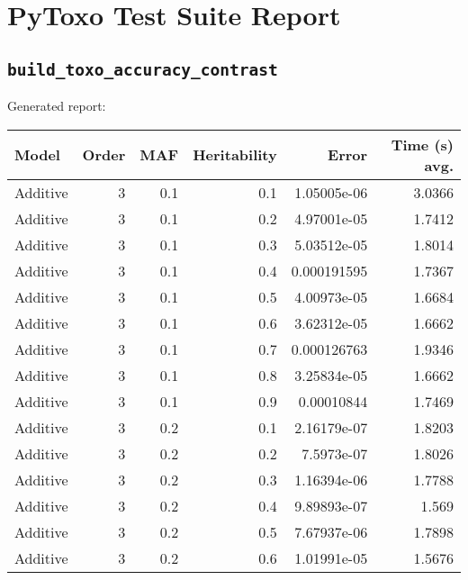 \documentclass{article}
\begin{document}
\section*{PyToxo Test Suite Report}
\subsection*{\texttt{build\_toxo\_accuracy\_contrast}}
Generated report:

\begin{longtable}[H]{lrrrrr}
\hline
 Model          &   Order &   MAF &   Heritability &            Error &   Time (s) avg. \\
\hline
 Additive       &       3 &   0.1 &            0.1 &      1.05005e-06 &          3.0366 \\
 Additive       &       3 &   0.1 &            0.2 &      4.97001e-05 &          1.7412 \\
 Additive       &       3 &   0.1 &            0.3 &      5.03512e-05 &          1.8014 \\
 Additive       &       3 &   0.1 &            0.4 &      0.000191595 &          1.7367 \\
 Additive       &       3 &   0.1 &            0.5 &      4.00973e-05 &          1.6684 \\
 Additive       &       3 &   0.1 &            0.6 &      3.62312e-05 &          1.6662 \\
 Additive       &       3 &   0.1 &            0.7 &      0.000126763 &          1.9346 \\
 Additive       &       3 &   0.1 &            0.8 &      3.25834e-05 &          1.6662 \\
 Additive       &       3 &   0.1 &            0.9 &      0.00010844  &          1.7469 \\
 Additive       &       3 &   0.2 &            0.1 &      2.16179e-07 &          1.8203 \\
 Additive       &       3 &   0.2 &            0.2 &      7.5973e-07  &          1.8026 \\
 Additive       &       3 &   0.2 &            0.3 &      1.16394e-06 &          1.7788 \\
 Additive       &       3 &   0.2 &            0.4 &      9.89893e-07 &          1.569  \\
 Additive       &       3 &   0.2 &            0.5 &      7.67937e-06 &          1.7898 \\
 Additive       &       3 &   0.2 &            0.6 &      1.01991e-05 &          1.5676 \\

\end{longtable}
\end{document}
